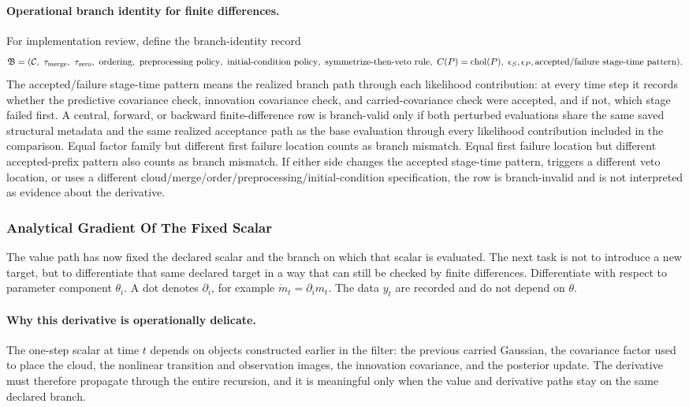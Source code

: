\documentclass[11pt]{article}
\numberwithin{equation}{section}
\newcommand{\chol}{\operatorname{chol}}
\begin{document}
\paragraph{Operational branch identity for finite differences.}
For implementation review, define the branch-identity record
\begin{equation}
  \mathfrak B
  =
  (\mathcal C,\ \tau_{\rm merge},\ \tau_{\rm zero},\ \text{ordering},\
   \text{preprocessing policy},\ \text{initial-condition policy},\
   \text{symmetrize-then-veto rule},\ C(P)=\chol(P),\ \epsilon_S,\epsilon_P,
   \text{accepted/failure stage-time pattern}).
  \label{eq:p32-branch-identity-record}
\end{equation}
The accepted/failure stage-time pattern means the realized branch path through
each likelihood contribution: at every time step it records whether the
predictive covariance check, innovation covariance check, and carried-covariance
check were accepted, and if not, which stage failed first.  A central, forward,
or backward finite-difference row is branch-valid only if both perturbed
evaluations share the same saved structural metadata and the same realized
acceptance path as the base evaluation through every likelihood contribution
included in the comparison.  Equal factor family but different first failure
location counts as branch mismatch.  Equal first failure location but different
accepted-prefix pattern also counts as branch mismatch.  If either side changes
the accepted stage-time pattern, triggers a different veto location, or uses a
different cloud/merge/order/preprocessing/initial-condition specification, the
row is branch-invalid and is not interpreted as evidence about the derivative.

\subsubsection{Analytical Gradient Of The Fixed Scalar}
\label{sec:p31-gradient}

The value path has now fixed the declared scalar and the branch on which that
scalar is evaluated.  The next task is not to introduce a new target, but to
differentiate that same declared target in a way that can still be checked by
finite differences.  Differentiate with respect to parameter component \(\theta_i\).
A dot denotes \(\partial_i\), for example \(\dot m_t=\partial_i m_t\).  The data
\(y_t\) are recorded and do not depend on \(\theta\).

\paragraph{Why this derivative is operationally delicate.}
The one-step scalar at time \(t\) depends on objects constructed earlier in the
filter: the previous carried Gaussian, the covariance factor used to place the
cloud, the nonlinear transition and observation images, the innovation
covariance, and the posterior update.  The derivative must therefore propagate
through the entire recursion, and it is meaningful only when the value and
derivative paths stay on the same declared branch.
\end{document}

